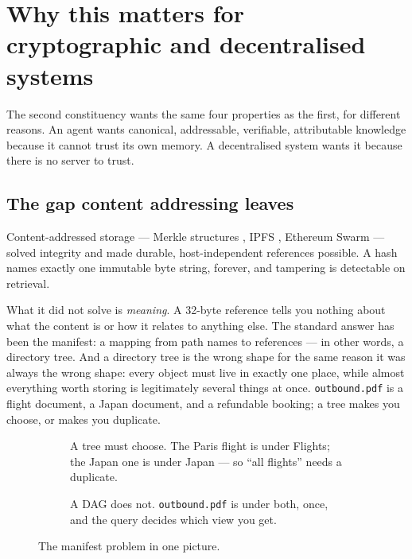 \section{Why this matters for cryptographic and decentralised systems}
\label{sec:crypto}

The second constituency wants the same four properties as the first, for
different reasons. An agent wants canonical, addressable, verifiable,
attributable knowledge because it cannot trust its own memory. A decentralised
system wants it because there is no server to trust.

\subsection{The gap content addressing leaves}

Content-addressed storage --- Merkle structures \citep{merkle1987}, IPFS
\citep{benet2014}, Ethereum Swarm \citep{tron2020} --- solved integrity and
made durable, host-independent references possible. A hash names exactly one
immutable byte string, forever, and tampering is detectable on retrieval.

What it did not solve is \emph{meaning}. A 32-byte reference tells you nothing
about what the content is or how it relates to anything else. The standard
answer has been the manifest: a mapping from path names to references --- in
other words, a directory tree. And a directory tree is the wrong shape for the
same reason it was always the wrong shape: every object must live in exactly
one place, while almost everything worth storing is legitimately several
things at once. \texttt{outbound.pdf} is a flight document, a Japan document,
and a refundable booking; a tree makes you choose, or makes you duplicate.

\begin{figure}[h]
\centering
\begin{subfigure}[b]{0.47\textwidth}\centering
  \caption{A tree must choose. The Paris flight is under
  \textsf{Flights}; the Japan one is under \textsf{Japan} --- so
  ``all flights'' needs a duplicate.}
\end{subfigure}\hfill
\begin{subfigure}[b]{0.47\textwidth}\centering
  \caption{A DAG does not. \texttt{outbound.pdf} is under both, once, and
  the query decides which view you get.}
\end{subfigure}
\caption{The manifest problem in one picture.}
\label{fig:tree-vs-dag}
\end{figure}

